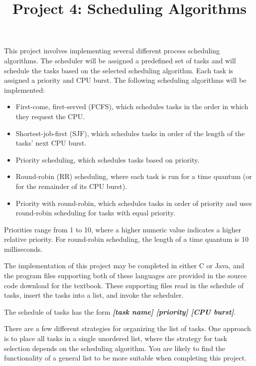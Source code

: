 \documentclass[UTF8,10pt,a4paper]{article}
\title{Project 4: 
Scheduling Algorithms}
\date{}
\theoremstyle{Problem}
\theoremstyle{Solution}
\begin{document}
\maketitle
\thispagestyle{FirstPageStyle}

This project involves implementing several different process scheduling algorithms. The scheduler will be assigned a predefined set of tasks and will schedule the tasks based on the selected scheduling algorithm. Each task is assigned a priority and CPU burst. The following scheduling algorithms will be implemented:

\begin{itemize}
    \item First-come, first-served (FCFS), which schedules tasks in the order in which they request the CPU.
    \item Shortest-job-first (SJF), which schedules tasks in order of the length of the tasks’ next CPU burst.
    \item Priority scheduling, which schedules tasks based on priority.
    \item Round-robin (RR) scheduling, where each task is run for a time quantum (or for the remainder of its CPU burst).
    \item Priority with round-robin, which schedules tasks in order of priority and uses round-robin scheduling for tasks with equal priority.
\end{itemize}

Priorities range from 1 to 10, where a higher numeric value indicates a higher relative priority. For round-robin scheduling, the length of a time quantum is 10 milliseconds.

The implementation of this project may be completed in either C or Java, and the program files supporting both of these languages are provided in the source code download for the textbook. These supporting files read in the schedule of tasks, insert the tasks into a list, and invoke the scheduler.

The schedule of tasks has the form \textbf{\textit{[task name] [priority] [CPU burst]}}.

There are a few different strategies for organizing the list of tasks. One approach is to place all tasks in a single unordered list, where the strategy for task selection depends on the scheduling algorithm. You are likely to find the functionality of a general list to be more suitable when completing this project.
\end{document}
